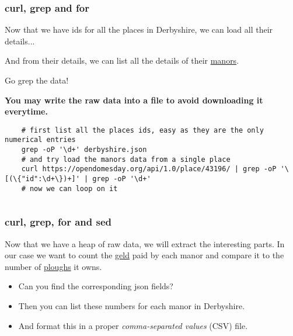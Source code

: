 \subsubsection{curl, grep and for}

Now that we have ids for all the places in Derbyshire, we can load all their details...

And from their details, we can list all the details of their \href{http://www.domesdaybook.net/domesday-book/structure-of-domesday-book/manor}{manors}.

Go grep the data!

{\bf You may write the raw data into a file to avoid downloading it everytime.}

\ifdefined\answer
\begin{verbatim}
    # first list all the places ids, easy as they are the only numerical entries
    grep -oP '\d+' derbyshire.json
    # and try load the manors data from a single place
    curl https://opendomesday.org/api/1.0/place/43196/ | grep -oP '\[(\{"id":\d+\})+]' | grep -oP '\d+'
    # now we can loop on it
\end{verbatim}
\inputminted[firstline=9,lastline=23]{bash}{TD1_Linux_shell_answers.sh}
\fi

\subsubsection{curl, grep, for and sed}

Now that we have a heap of raw data, we will extract the interesting parts.
In our case we want to count the \href{http://www.domesdaybook.net/domesday-book/data-terminology/taxation/tax-or-geld}{geld} paid by each manor
and compare it to the number of \href{http://www.domesdaybook.net/domesday-book/data-terminology/taxation/plough}{ploughs} it owns.

\begin{itemize}
    \item Can you find the corresponding json fields?
    \item Then you can list these numbers for each manor in Derbyshire.
    \item And format this in a proper {\it comma-separated values} (CSV) file.
\end{itemize}

